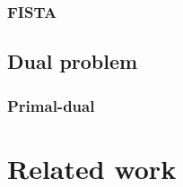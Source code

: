 \subsection{FISTA}

\section{Dual problem}

\subsection{Primal-dual}


\chapter{Related work} \label{chap:related_work}

